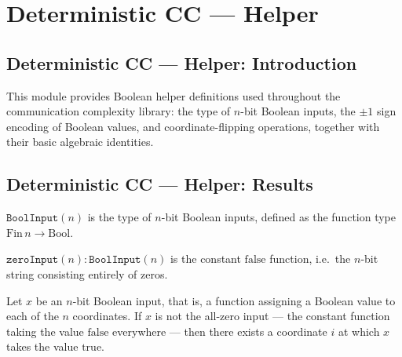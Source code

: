 \section{Deterministic CC --- Helper}
\subsection*{Deterministic CC --- Helper: Introduction}

This module provides Boolean helper definitions used throughout the communication
complexity library: the type of $n$-bit Boolean inputs, the $\pm 1$ sign encoding
of Boolean values, and coordinate-flipping operations, together with their basic
algebraic identities.

\subsection*{Deterministic CC --- Helper: Results}

\begin{definition}
\label{CommunicationComplexity.BoolInput}
\leanok
$\texttt{BoolInput}(n)$ is the type of $n$-bit Boolean inputs, defined as the function
type $\mathrm{Fin}\,n \to \mathrm{Bool}$.
\end{definition}

\begin{definition}
\label{CommunicationComplexity.zeroInput}
\leanok
{}
$\texttt{zeroInput}(n) : \texttt{BoolInput}(n)$ is the constant $\mathrm{false}$ function,
i.e.\ the $n$-bit string consisting entirely of zeros.
\end{definition}

\begin{lemma}
\label{CommunicationComplexity.exists_true_of_ne_zeroInput}
\leanok
{}
Let $x$ be an $n$-bit Boolean input, that is, a function assigning a Boolean value to
each of the $n$ coordinates. If $x$ is not the all-zero input — the constant function
taking the value $\mathrm{false}$ everywhere — then there exists a coordinate $i$ at
which $x$ takes the value $\mathrm{true}$.
\end{lemma}

